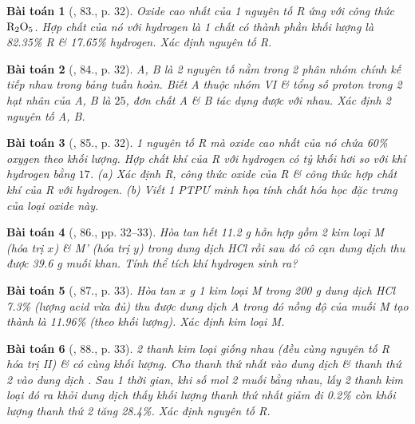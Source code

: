 \documentclass{article}
\newtheorem{baitoan}{Bài toán}
\begin{document}
\begin{baitoan}[\cite{An_400_BT_Hoa_Hoc_9}, 83., p. 32]
	Oxide cao nhất của 1 nguyên tố R ứng với công thức $\rm R_2O_5$. Hợp chất của nó với hydrogen là 1 chất có thành phần khối lượng là {\rm82.35\%} R \& {\rm17.65\%} hydrogen. Xác định nguyên tố R.
\end{baitoan}

\begin{baitoan}[\cite{An_400_BT_Hoa_Hoc_9}, 84., p. 32]
	A, B là 2 nguyên tố nằm trong 2 phân nhóm chính kế tiếp nhau trong bảng tuần hoàn. Biết A thuộc nhóm VI \& tổng số proton trong 2 hạt nhân của A, B là $25$, đơn chất A \& B tác dụng được với nhau. Xác định 2 nguyên tố A, B.
\end{baitoan}

\begin{baitoan}[\cite{An_400_BT_Hoa_Hoc_9}, 85., p. 32]
	1 nguyên tố R mà oxide cao nhất của nó chứa {\rm60\%} oxygen theo khối lượng. Hợp chất khí của R với hydrogen có tỷ khối hơi so với khí hydrogen bằng $17$. (a) Xác định R, công thức oxide của R \& công thức hợp chất khí của R với hydrogen. (b) Viết 1 {\rm PTPƯ} minh họa tính chất hóa học đặc trưng của loại oxide này.
\end{baitoan}

\begin{baitoan}[\cite{An_400_BT_Hoa_Hoc_9}, 86., pp. 32--33]
	Hòa tan hết {\rm11.2 g} hỗn hợp gồm 2 kim loại M (hóa trị $x$) \& M' (hóa trị $y$) trong dung dịch {\rm HCl} rồi sau đó cô cạn dung dịch thu được {\rm39.6 g} muối khan. Tính thể tích khí hydrogen sinh ra?
\end{baitoan}

\begin{baitoan}[\cite{An_400_BT_Hoa_Hoc_9}, 87., p. 33]
	Hòa tan $x$ {\rm g} 1 kim loại M trong {\rm200 g} dung dịch {\rm HCl 7.3\%} (lượng acid vừa đủ) thu được dung dịch A trong đó nồng độ của muối M tạo thành là {\rm11.96\%} (theo khối lượng). Xác định kim loại M.
\end{baitoan}

\begin{baitoan}[\cite{An_400_BT_Hoa_Hoc_9}, 88., p. 33]
	2 thanh kim loại giống nhau (đều cùng nguyên tố R hóa trị II) \& có cùng khối lượng. Cho thanh thứ nhất vào dung dịch {\rm{}} \& thanh thứ 2 vào dung dịch {\rm{}}. Sau 1 thời gian, khi số mol 2 muối bằng nhau, lấy 2 thanh kim loại đó ra khỏi dung dịch thấy khối lượng thanh thứ nhất giảm đi {\rm0.2\%} còn khối lượng thanh thứ 2 tăng {\rm28.4\%}. Xác định nguyên tố R.
\end{baitoan}
\end{document}
